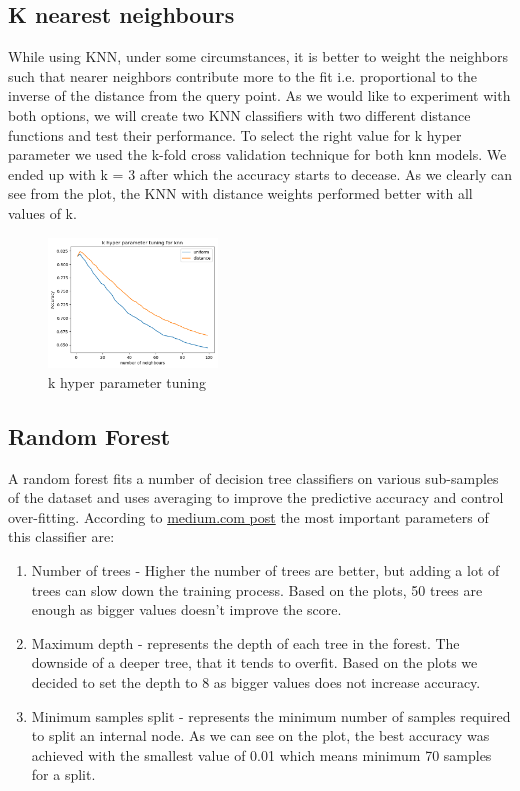 \documentclass[12pt]{article}
\begin{document}
\subsection{K nearest neighbours}
While using KNN, under some circumstances, it is better to weight the neighbors such that nearer neighbors contribute more to the fit i.e. proportional to the inverse of the distance from the query point. As we would like to experiment with both options, we will create two KNN classifiers with two different distance functions and test their performance. To select the right value for k hyper parameter we used the k-fold cross validation technique for both knn models. We ended up with k = 3 after which the accuracy starts to decease. As we clearly can see from the plot, the KNN with distance weights performed better with all values of k.
\begin{figure}[h]
\centering
\includegraphics[width=0.4\textwidth]{Cross_valid_plots/k_hyper_fig}
\caption{k hyper parameter tuning}
\end{figure}

\subsection{Random Forest}
A random forest fits a number of decision tree classifiers on various sub-samples of the dataset and uses averaging to improve the predictive accuracy and control over-fitting. According to \href{https://medium.com/all-things-ai/in-depth-parameter-tuning-for-random-forest-d67bb7e920d}{medium.com post} the most important parameters of this classifier are:
\begin{enumerate}
	\item Number of trees - Higher the number of trees are better, but adding a lot of trees can slow down the training process. Based on the plots, 50 trees are enough as bigger values doesn't improve the score.
	\item Maximum depth - represents the depth of each tree in the forest. The downside of a deeper tree, that it tends to overfit. Based on the plots we decided to set the depth to 8 as bigger values does not increase accuracy.
	\item Minimum samples split - represents the minimum number of samples required to split an internal node. As we can see on the plot, the best accuracy was achieved with the smallest value of 0.01 which means minimum 70 samples for a split.
\end{enumerate}
\end{document}
